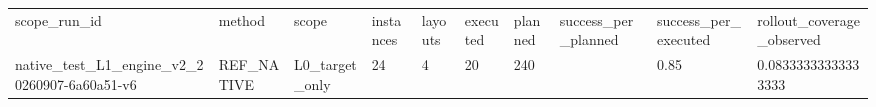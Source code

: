 \begin{tabular}{llllllllll}
scope\_run\_id & method & scope & instances & layouts & executed & planned & success\_per\_planned & success\_per\_executed & rollout\_coverage\_observed \\
native\_test\_L1\_engine\_v2\_20260907-6a60a51-v6 & REF\_NATIVE & L0\_target\_only & 24 & 4 & 20 & 240 &  & 0.85 & 0.08333333333333333 \\
\end{tabular}
